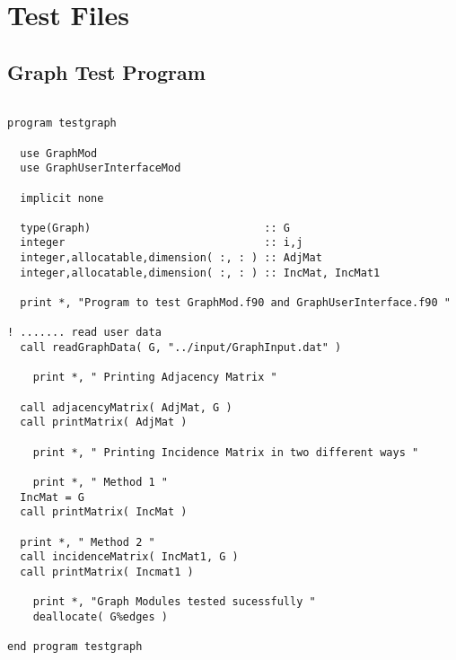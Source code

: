 \documentclass[10pt,a4paper,margin = 1.25cm]{article}
\begin{document}
\section*{Test Files}
\subsection*{Graph Test Program}
\begin{lstlisting}

program testgraph
  
  use GraphMod
  use GraphUserInterfaceMod

  implicit none

  type(Graph)                           :: G  
  integer                               :: i,j    
  integer,allocatable,dimension( :, : ) :: AdjMat   
  integer,allocatable,dimension( :, : ) :: IncMat, IncMat1  
  
  print *, "Program to test GraphMod.f90 and GraphUserInterface.f90 "

! ....... read user data
  call readGraphData( G, "../input/GraphInput.dat" )    
	
	print *, " Printing Adjacency Matrix "
	
  call adjacencyMatrix( AdjMat, G )        
  call printMatrix( AdjMat )

	print *, " Printing Incidence Matrix in two different ways "
	
	print *, " Method 1 "
  IncMat = G
  call printMatrix( IncMat )
  
  print *, " Method 2 "
  call incidenceMatrix( IncMat1, G )
  call printMatrix( Incmat1 )
	
	print *, "Graph Modules tested sucessfully "	
	deallocate( G%edges )
	
end program testgraph


\end{lstlisting}
\end{document}
